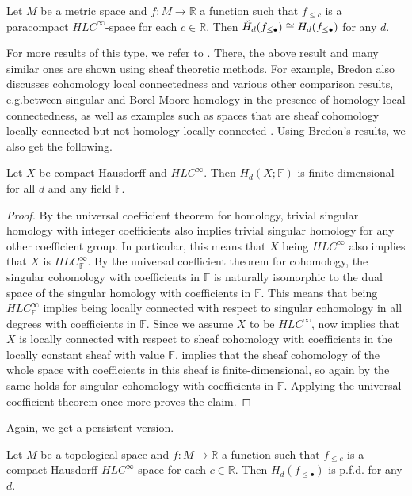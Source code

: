\begin{cor}\label{cor:cech_sing_persistent_iso}
	Let $M$ be a metric space and $f\colon M\to\mathbb{R}$ a function such that $f_{\leq c}$ is a paracompact $HLC^\infty$-space for each $c\in\mathbb{R}$. Then $\check{H}_d(f_{\leq\bullet})\cong H_d(f_{\leq\bullet})$ for any $d$.
\end{cor}

For more results of this type, we refer to \cite{MR1481706}. There, the above result \cite[Corollary VI.12.6]{MR1481706} and many similar ones are shown using sheaf theoretic methods. For example, Bredon also discusses cohomology local connectedness \cite[Section II.17]{MR1481706} and various other comparison results, e.g.\@ between singular and Borel-Moore homology \cite[Corollary V.12.15]{MR1481706} in the presence of homology local connectedness, as well as examples such as spaces that are sheaf cohomology locally connected but not homology locally connected \cite[Example II.17.12]{MR1481706}. Using Bredon's results, we also get the following.

\begin{prop}\label{prop:fin_dim_sing_hom}
	Let $X$ be compact Hausdorff and $HLC^{\infty}$. Then $H_d(X;\mathbb{F})$ is finite-dimensional for all $d$ and any field $\mathbb{F}$.
\end{prop}
 
\begin{proof}
	By the universal coefficient theorem for homology, trivial singular homology with integer coefficients also implies trivial singular homology for any other coefficient group. In particular, this means that $X$ being $HLC^{\infty}$ also implies that $X$ is $HLC^{\infty}_{\mathbb{F}}$. By the universal coefficient theorem for cohomology, the singular cohomology with coefficients in $\mathbb{F}$ is naturally isomorphic to the dual space of the singular homology with coefficients in $\mathbb{F}$. This means that being $HLC^{\infty}_{\mathbb{F}}$ implies being locally connected with respect to singular cohomology in all degrees with coefficients in $\mathbb{F}$. Since we assume $X$ to be $HLC^{\infty}$, \cite[Theorem III.1.1]{MR1481706} now implies that $X$ is locally connected with respect to sheaf cohomology with coefficients in the locally constant sheaf with value $\mathbb{F}$. \cite[Corollary II.17.7]{MR1481706} implies that the sheaf cohomology of the whole space with coefficients in this sheaf is finite-dimensional, so again by \cite[Theorem III.1.1]{MR1481706} the same holds for singular cohomology with coefficients in $\mathbb{F}$. Applying the universal coefficient theorem once more proves the claim.
\end{proof}

Again, we get a persistent version.

\begin{cor}
	Let $M$ be a topological space and $f\colon M\to\mathbb{R}$ a function such that $f_{\leq c}$ is a compact Hausdorff $HLC^\infty$-space for each $c\in\mathbb{R}$. Then $H_d(f_{\leq\bullet})$ is p.f.d. for any $d$.
\end{cor}